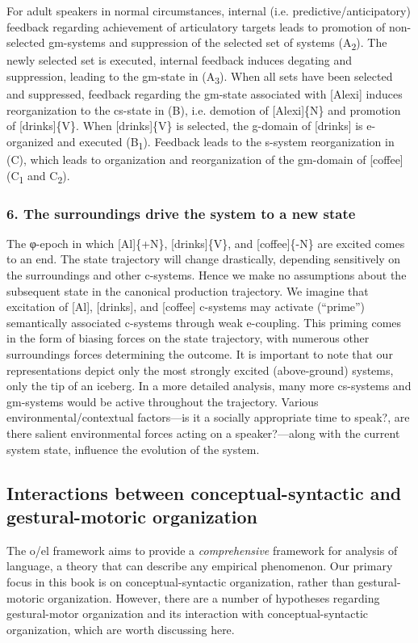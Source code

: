   For adult speakers in normal circumstances, internal (i.e. predictive/anticipatory) feedback regarding achievement of articulatory targets leads to promotion of non-selected gm-systems and suppression of the selected set of systems (A\textsubscript{2}). The newly selected set is executed, internal feedback induces degating and suppression, leading to the gm-state in (A\textsubscript{3}). When all sets have been selected and suppressed, feedback regarding the gm-state associated with [Alexi] induces reorganization to the cs-state in (B), i.e. demotion of [Alexi]\{N\} and promotion of [drinks]\{V\}. When [drinks]\{V\} is selected, the g-domain of [drinks] is e-organized and executed (B\textsubscript{1}). Feedback leads to the s-system reorganization in (C), which leads to organization and reorganization of the gm-domain of [coffee] (C\textsubscript{1} and C\textsubscript{2}).

\subsubsection{6. The surroundings drive the system to a new state}

The φ-epoch in which [Al]\{+N\}, [drinks]\{V\}, and [coffee]\{-N\} are excited comes to an end. The state trajectory will change drastically, depending sensitively on the surroundings and other c-systems. Hence we make no assumptions about the subsequent state in the canonical production trajectory. We imagine that excitation of [Al], [drinks], and [coffee] c-systems may activate (“prime”) semantically associated c-systems through weak e-coupling. This priming comes in the form of biasing forces on the state trajectory, with numerous other surroundings forces determining the outcome. It is important to note that our representations depict only the most strongly excited (above-ground) systems, only the tip of an iceberg. In a more detailed analysis, many more cs-systems and gm-systems would be active throughout the trajectory. Various environmental/contextual factors—is it a socially appropriate time to speak?, are there salient environmental forces acting on a speaker?—along with the current system state, influence the evolution of the system. 

\subsection{Interactions between conceptual-syntactic and gestural-motoric organization}

The o/el framework aims to provide a \textit{comprehensive} framework for analysis of language, a theory that can describe any empirical phenomenon. Our primary focus in this book is on conceptual-syntactic organization, rather than gestural-motoric organization. However, there are a number of hypotheses regarding gestural-motor organization and its interaction with conceptual-syntactic organization, which are worth discussing here.

